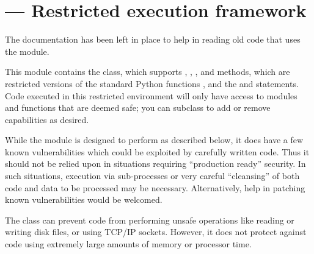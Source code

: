 \section{ ---
         Restricted execution framework}


\begin{notice}[warning]
  The documentation has been left in place to help in reading old code
  that uses the module.
\end{notice}

This module contains the  class, which supports
, , , and
 methods, which are restricted versions of the standard
Python functions ,  and
the  and  statements.
Code executed in this restricted environment will
only have access to modules and functions that are deemed safe; you
can subclass  to add or remove capabilities as desired.

\begin{notice}[warning]
  While the  module is designed to perform as described
  below, it does have a few known vulnerabilities which could be
  exploited by carefully written code.  Thus it should not be relied
  upon in situations requiring ``production ready'' security.  In such
  situations, execution via sub-processes or very careful
  ``cleansing'' of both code and data to be processed may be
  necessary.  Alternatively, help in patching known 
  vulnerabilities would be welcomed.
\end{notice}

\begin{notice}
  The  class can prevent code from performing unsafe
  operations like reading or writing disk files, or using TCP/IP
  sockets.  However, it does not protect against code using extremely
  large amounts of memory or processor time.
\end{notice}

